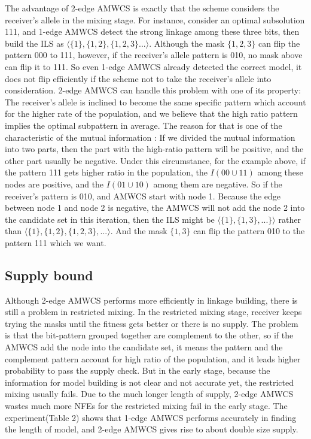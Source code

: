 \documentclass{sig-alternate-05-2015}
\begin{document}
The advantage of 2-edge AMWCS is exactly that the scheme considers the receiver{\rq}s allele in the mixing stage. For instance, consider an optimal subsolution 111, and 1-edge AMWCS detect the  strong  linkage  among  these  three bits, then build the ILS as  $\langle \{1\}, \{1, 2\}, \{1, 2, 3\}... \rangle$. Although the mask $\{1, 2, 3\}$ can flip the pattern 000 to 111, however, if the receiver{\rq}s allele pattern is 010, no mask above can flip it to 111. So even 1-edge AMWCS already detected the correct model, it does not  flip efficiently if the scheme not to take the receiver{\rq}s allele into consideration. 2-edge AMWCS can handle this problem with one of its property: The receiver{\rq}s allele is inclined to become the same specific pattern which account for the higher rate of the population, and we believe that the high ratio pattern implies the optimal subpattern in average. The reason for that is one of the characteristic of the mutual information :  If we divided the mutual information into two parts, then the part with the high-ratio pattern will be positive, and the other part usually be negative. Under this circumstance, for the example above, if the pattern 111 gets higher ratio in the population, the $I(00\cup11)$ among these nodes are positive, and the $I(01\cup10)$ among them are negative. So if the receiver{\rq}s pattern is 010, and AMWCS start with node 1. Because the edge between node 1 and node 2 is negative, the AMWCS will not add the node 2 into the candidate set in this iteration, then the ILS might be $\langle\{1\}, \{1, 3\}, ...\}\rangle$ rather than $\langle\{1\}, \{1, 2\}, \{1, 2, 3\}, ...\rangle$. And the mask $\{1, 3\}$ can flip the pattern 010 to the pattern 111 which we want.    


\subsection{Supply bound}
Although 2-edge AMWCS performs more efficiently in linkage building, there is still a problem in restricted mixing. In 
the restricted mixing stage, receiver keeps trying the masks until the fitness gets better or there is no supply. The problem is that  the bit-pattern grouped together are complement to the other, so if the AMWCS add the node into the candidate set, it means the pattern and the complement pattern account for high ratio of the population, and it leads higher probability to pass the supply check. But in the early stage, because the information for model building is not clear and not accurate yet, the restricted mixing usually fails. Due to the much longer length of supply, 2-edge AMWCS wastes much more NFEs for the restricted mixing fail in the early stage. The experiment(Table 2) shows that  1-edge AMWCS performs accurately in finding the  length of model, and 2-edge AMWCS gives rise to about double size supply.
\end{document}
